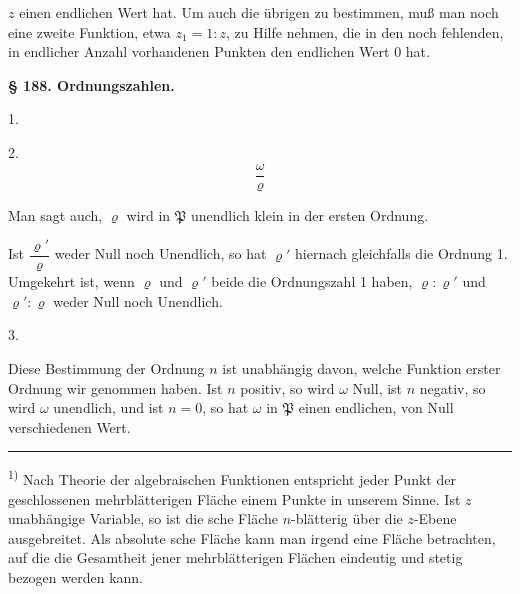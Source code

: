 $z$ einen endlichen Wert hat. Um auch die übrigen zu bestimmen, muß man noch eine zweite Funktion, etwa $z_1 = 1 : z$, zu Hilfe nehmen, die in den noch fehlenden, in endlicher Anzahl vorhandenen Punkten den endlichen Wert 0 hat.


\begin{center}
\textbf{§ 188. Ordnungszahlen.}
\end{center}

1. 

2. 
\[
\frac{\omega}{\varrho}
\]

Man sagt auch, $\varrho$ wird in $\mathfrak{P}$ unendlich klein in der ersten Ordnung.

Ist $\dfrac{\varrho'}{\varrho}$ weder Null noch Unendlich, so hat $\varrho'$ hiernach gleichfalls die Ordnung 1. Umgekehrt ist, wenn $\varrho$ und $\varrho'$ beide die Ordnungszahl 1 haben, $\varrho : \varrho'$ und $\varrho' : \varrho$ weder Null noch Unendlich.

3. 

Diese Bestimmung der Ordnung $n$ ist unabhängig davon, welche Funktion erster Ordnung wir genommen haben. Ist $n$ positiv, so wird $\omega$ Null, ist $n$ negativ, so wird $\omega$ unendlich, und ist $n = 0$, so hat $\omega$ in $\mathfrak{P}$ einen endlichen, von Null verschiedenen Wert.

\medskip\noindent\rule{4cm}{0.4pt}\par
\textsuperscript{1)} Nach  Theorie der algebraischen Funktionen entspricht jeder Punkt der geschlossenen mehrblätterigen Fläche einem Punkte in unserem Sinne. Ist $z$ unabhängige Variable, so ist die sche Fläche $n$-blätterig über die $z$-Ebene ausgebreitet.
Als absolute sche Fläche kann man irgend eine Fläche betrachten, auf die die Gesamtheit jener mehrblätterigen Flächen eindeutig und stetig bezogen werden kann.
